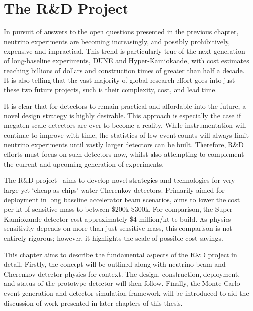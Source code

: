 \chapter{The \chips R\&D Project} %
\label{chap:chips}

In pursuit of answers to the open questions presented in the previous chapter, neutrino
experiments are becoming increasingly, and possibly prohibitively, expensive and impractical. This
trend is particularly true of the next generation of long-baseline experiments, DUNE and
Hyper-Kamiokande, with cost estimates reaching billions of dollars and construction times of
greater than half a decade. It is also telling that the vast majority of global research effort
goes into just these two future projects, such is their complexity, cost, and lead time.

It is clear that for detectors to remain practical and affordable into the future, a novel design
strategy is highly desirable. This approach is especially the case if megaton scale detectors are
ever to become a reality. While instrumentation will continue to improve with time, the statistics
of low event counts will always limit neutrino experiments until vastly larger detectors can be
built. Therefore, R\&D efforts must focus on such detectors now, whilst also attempting to
complement the current and upcoming generation of experiments.

The \chips R\&D project~\cite{adamson2013} aims to develop novel strategies and technologies for
very large yet `cheap as chips' water Cherenkov detectors. Primarily aimed for deployment in long
baseline accelerator beam scenarios, \chips aims to lower the cost per kt of sensitive mass to
between \$200k-\$300k. For comparison, the Super-Kamiokande detector cost approximately \$4
million/kt to build. As physics sensitivity depends on more than just sensitive mass, this
comparison is not entirely rigorous; however, it highlights the scale of possible cost savings.

This chapter aims to describe the fundamental aspects of the \chips R\&D project in detail.
Firstly, the \chips concept will be outlined along with neutrino beam and Cherenkov detector
physics for context. The design, construction, deployment, and status of the \chipsfive prototype
detector will then follow. Finally, the Monte Carlo event generation and detector simulation
framework will be introduced to aid the discussion of work presented in later chapters of this
thesis.


